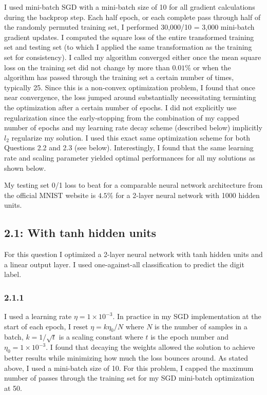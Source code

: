 \documentclass[12pt]{amsart}
\begin{document}
I used mini-batch SGD with a mini-batch size of 10 for all gradient calculations during the backprop step.  Each half epoch, or each complete pass through half of the randomly permuted training set, I performed 30,000/10 = 3,000 mini-batch gradient updates.  I computed the square loss of the entire transformed training set and testing set (to which I applied the same transformation as the training set for consistency).  I called my algorithm converged either once the mean square loss on the training set did not change by more than $0.01\%$ or when the algorithm has passed through the training set a certain number of times, typically 25.  Since this is a non-convex optimization problem, I found that once near convergence, the loss jumped around substantially necessitating terminting the optimization after a certain number of epochs.  I did not explicitly use regularization since the early-stopping from the combination of my capped number of epochs and my learning rate decay scheme (described below) implicitly $l_2$ regularize my solution.  I used this exact same optimization scheme for both Questions 2.2 and 2.3 (see below).  Interestingly, I found that the same learning rate and scaling parameter yielded optimal performances for all my solutions as shown below.

My testing set 0/1 loss to beat for a comparable neural network architecture from the official MNIST website is $4.5\%$ for a 2-layer neural network with 1000 hidden units.  

\subsection*{2.1: With tanh hidden units}
For this question I optimized a 2-layer neural network with tanh hidden units and a linear output layer.  I used one-against-all classification to predict the digit label.

\subsubsection*{2.1.1}
I used a learning rate $\eta = 1 \times 10^{-3}$.  In practice in my SGD implementation at the start of each epoch, I reset $\eta = k\eta_0/N$ where $N$ is the number of samples in a batch, $k = 1/\sqrt{t}$ is a scaling constant where $t$ is the epoch number and $\eta_0 = 1 \times 10^{-3}$.  I found that decaying the weights allowed the solution to achieve better results while minimizing how much the loss bounces around.   As stated above, I used a mini-batch size of 10.  For this problem, I capped the maximum number of passes through the training set for my SGD mini-batch optimization at 50.
\end{document}
